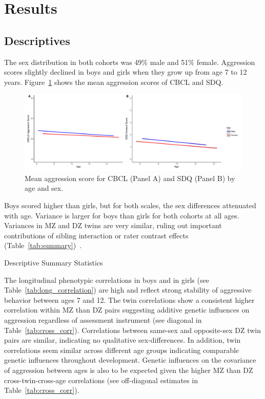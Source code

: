 ﻿\section{Results}
\subsection{Descriptives}
The sex distribution in both cohorts was 49\% male and 51\% female.
Aggression scores slightly declined in boys and girls when they grow up from age 7 to 12 years.
Figure~\ref{fig:meanAggression} shows the mean aggression scores of CBCL and SDQ\@.

\begin{figure}[htpb]
  \centering
  \includegraphics[width=0.99\linewidth]{longHera/figure/aggression_mean_score.pdf}
  \caption[Mean Aggression score]{Mean aggression score for CBCL (Panel A) and SDQ (Panel B) by age and sex.}
  \label{fig:meanAggression}
\end{figure}

Boys scored higher than girls, but for both scales, the sex differences attenuated with age.
Variance is larger for boys than girls for both cohorts at all ages.
Variances in MZ and DZ twins are very similar, ruling out important contributions of sibling interaction or rater contrast effects (Table~\ref{tab:summary})~\cite{Eaves1978, Balakrishnan2014}.

\begin{table}[hbt]
  \centering
  \caption[Descriptive Summary Statistics of CBCL and SDQ]{Descriptive Summary Statistics}\label{tab:summary}
\end{table}

The longitudinal phenotypic correlations in boys and in girls (see Table~\ref{tab:long_correlation}) are high and reflect strong stability of aggressive behavior between ages 7 and 12.
The twin correlations show a consistent higher correlation within MZ than DZ pairs suggesting additive genetic influences on aggression regardless of assessment instrument (see diagonal in Table~\ref{tab:cross_corr}).
Correlations between same-sex and opposite-sex DZ twin pairs are similar, indicating no qualitative sex-differences.
In addition, twin correlations seem similar across different age groups indicating comparable genetic influences throughout development.
Genetic influences on the covariance of aggression between ages is also to be expected given the higher MZ than DZ cross-twin-cross-age correlations (see off-diagonal estimates in Table~\ref{tab:cross_corr}). 

